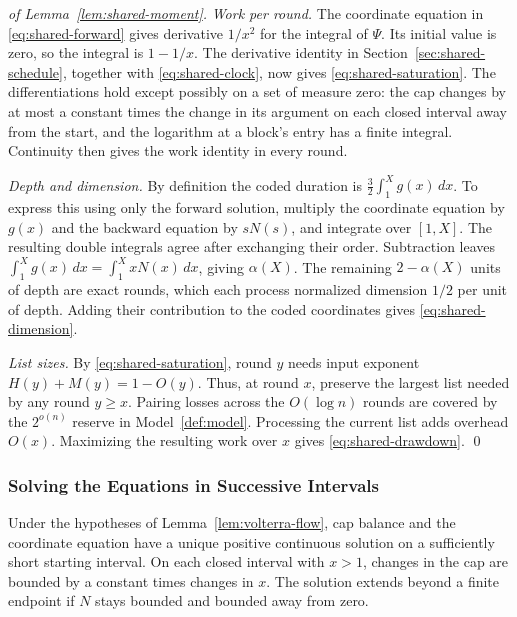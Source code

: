 \documentclass[runningheads,envcountsame,envcountsect,orivec]{llncs}
\begin{document}
\begin{proof}[of Lemma~\ref{lem:shared-moment}]
\textit{Work per round.}
The coordinate equation in \eqref{eq:shared-forward} gives
derivative $1/x^2$ for the integral of $\Psi$.
Its initial value is zero, so the integral is $1-1/x$.
The derivative identity in Section~\ref{sec:shared-schedule}, together with
\eqref{eq:shared-clock}, now gives
\eqref{eq:shared-saturation}. The differentiations hold
except possibly on a set of measure zero: the cap changes by
at most a constant times the change in its argument on each
closed interval away from the start, and the logarithm at a
block's entry has a finite integral. Continuity then gives
the work identity in every round.

\textit{Depth and dimension.}
By definition the coded duration is $\tfrac32\int_1^Xg(x)\,dx$.
To express this using only the forward solution, multiply
the coordinate equation by $g(x)$ and the backward equation
by $sN(s)$, and integrate over $[1,X]$.
The resulting double integrals agree after exchanging their
order. Subtraction leaves
$\int_1^Xg(x)\,dx=\int_1^XxN(x)\,dx$, giving $\alpha(X)$.
The remaining $2-\alpha(X)$ units of depth are exact rounds,
which each process normalized dimension $1/2$ per unit of
depth. Adding their contribution to the coded coordinates
gives \eqref{eq:shared-dimension}.

\textit{List sizes.}
By \eqref{eq:shared-saturation}, round $y$ needs input
exponent $H(y)+M(y)=1-O(y)$.
Thus, at round $x$, preserve the largest list needed by any
round $y\ge x$. Pairing losses across the $O(\log n)$ rounds
are covered by the $2^{o(n)}$ reserve in Model~\ref{def:model}.
Processing the current list adds overhead $O(x)$.
Maximizing the resulting work over $x$ gives
\eqref{eq:shared-drawdown}.
\qed
\end{proof}

\subsubsection{Solving the Equations in Successive Intervals}

\begin{lemma}
\label{lem:forward-continuation}
Under the hypotheses of Lemma~\ref{lem:volterra-flow}, cap
balance and the coordinate equation have a unique positive
continuous solution on a sufficiently short starting interval.
On each closed interval with $x>1$, changes in the cap are bounded
by a constant times changes in $x$. The solution extends beyond
a finite endpoint if $N$ stays bounded and bounded away from zero.
\end{lemma}
\end{document}
